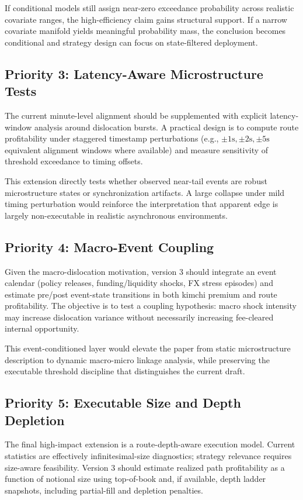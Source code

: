 \documentclass[11pt,a4paper]{article}
\begin{document}
If conditional models still assign near-zero exceedance probability across realistic covariate ranges, the high-efficiency claim gains structural support. If a narrow covariate manifold yields meaningful probability mass, the conclusion becomes conditional and strategy design can focus on state-filtered deployment.

\subsection{Priority 3: Latency-Aware Microstructure Tests}
The current minute-level alignment should be supplemented with explicit latency-window analysis around dislocation bursts. A practical design is to compute route profitability under staggered timestamp perturbations (e.g., $\pm 1\text{s}, \pm 2\text{s}, \pm 5\text{s}$ equivalent alignment windows where available) and measure sensitivity of threshold exceedance to timing offsets.

This extension directly tests whether observed near-tail events are robust microstructure states or synchronization artifacts. A large collapse under mild timing perturbation would reinforce the interpretation that apparent edge is largely non-executable in realistic asynchronous environments.

\subsection{Priority 4: Macro-Event Coupling}
Given the macro-dislocation motivation, version 3 should integrate an event calendar (policy releases, funding/liquidity shocks, FX stress episodes) and estimate pre/post event-state transitions in both kimchi premium and route profitability. The objective is to test a coupling hypothesis: macro shock intensity may increase dislocation variance without necessarily increasing fee-cleared internal opportunity.

This event-conditioned layer would elevate the paper from static microstructure description to dynamic macro-micro linkage analysis, while preserving the executable threshold discipline that distinguishes the current draft.

\subsection{Priority 5: Executable Size and Depth Depletion}
The final high-impact extension is a route-depth-aware execution model. Current statistics are effectively infinitesimal-size diagnostics; strategy relevance requires size-aware feasibility. Version 3 should estimate realized path profitability as a function of notional size using top-of-book and, if available, depth ladder snapshots, including partial-fill and depletion penalties.
\end{document}
